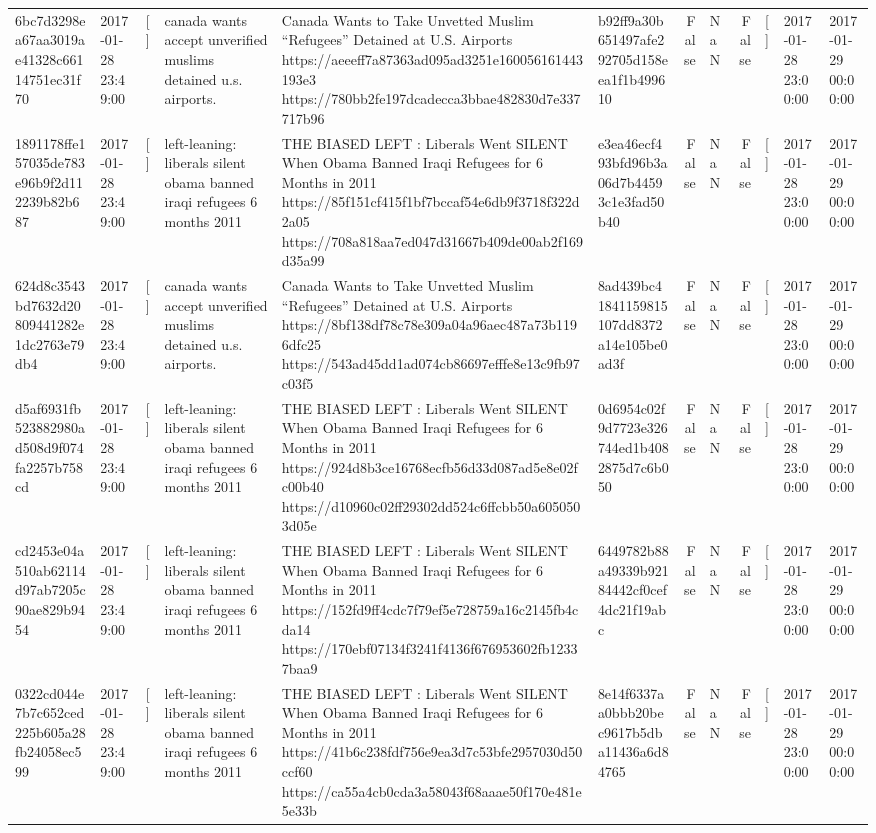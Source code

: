 \begin{tabular}{llllllrlrlll}
6bc7d3298ea67aa3019ae41328c66114751ec31f70 & 2017-01-28 23:49:00 & [] & canada wants accept unverified muslims detained u.s. airports. & Canada Wants to Take Unvetted Muslim “Refugees” Detained at U.S. Airports https://aeeeff7a87363ad095ad3251e160056161443193e3 https://780bb2fe197dcadecca3bbae482830d7e337717b96 & b92ff9a30b651497afe292705d158eea1f1b499610 & False & NaN & False & [] & 2017-01-28 23:00:00 & 2017-01-29 00:00:00 \\
1891178ffe157035de783e96b9f2d112239b82b687 & 2017-01-28 23:49:00 & [] & left-leaning: liberals silent obama banned iraqi refugees 6 months 2011 & THE BIASED LEFT : Liberals Went SILENT When Obama Banned Iraqi Refugees for 6 Months in 2011 https://85f151cf415f1bf7bccaf54e6db9f3718f322d2a05 https://708a818aa7ed047d31667b409de00ab2f169d35a99 & e3ea46ecf493bfd96b3a06d7b44593c1e3fad50b40 & False & NaN & False & [] & 2017-01-28 23:00:00 & 2017-01-29 00:00:00 \\
624d8c3543bd7632d20809441282e1dc2763e79db4 & 2017-01-28 23:49:00 & [] & canada wants accept unverified muslims detained u.s. airports. & Canada Wants to Take Unvetted Muslim “Refugees” Detained at U.S. Airports https://8bf138df78c78e309a04a96aec487a73b1196dfc25 https://543ad45dd1ad074cb86697efffe8e13c9fb97c03f5 & 8ad439bc41841159815107dd8372a14e105be0ad3f & False & NaN & False & [] & 2017-01-28 23:00:00 & 2017-01-29 00:00:00 \\
d5af6931fb523882980ad508d9f074fa2257b758cd & 2017-01-28 23:49:00 & [] & left-leaning: liberals silent obama banned iraqi refugees 6 months 2011 & THE BIASED LEFT : Liberals Went SILENT When Obama Banned Iraqi Refugees for 6 Months in 2011 https://924d8b3ce16768ecfb56d33d087ad5e8e02fc00b40 https://d10960c02ff29302dd524c6ffcbb50a6050503d05e & 0d6954c02f9d7723e326744ed1b4082875d7c6b050 & False & NaN & False & [] & 2017-01-28 23:00:00 & 2017-01-29 00:00:00 \\
cd2453e04a510ab62114d97ab7205c90ae829b9454 & 2017-01-28 23:49:00 & [] & left-leaning: liberals silent obama banned iraqi refugees 6 months 2011 & THE BIASED LEFT : Liberals Went SILENT When Obama Banned Iraqi Refugees for 6 Months in 2011 https://152fd9ff4cdc7f79ef5e728759a16c2145fb4cda14 https://170ebf07134f3241f4136f676953602fb12337baa9 & 6449782b88a49339b92184442cf0cef4dc21f19abc & False & NaN & False & [] & 2017-01-28 23:00:00 & 2017-01-29 00:00:00 \\
0322cd044e7b7c652ced225b605a28fb24058ec599 & 2017-01-28 23:49:00 & [] & left-leaning: liberals silent obama banned iraqi refugees 6 months 2011 & THE BIASED LEFT : Liberals Went SILENT When Obama Banned Iraqi Refugees for 6 Months in 2011 https://41b6c238fdf756e9ea3d7c53bfe2957030d50ccf60 https://ca55a4cb0cda3a58043f68aaae50f170e481e5e33b & 8e14f6337aa0bbb20bec9617b5dba11436a6d84765 & False & NaN & False & [] & 2017-01-28 23:00:00 & 2017-01-29 00:00:00 \\

\end{tabular}
